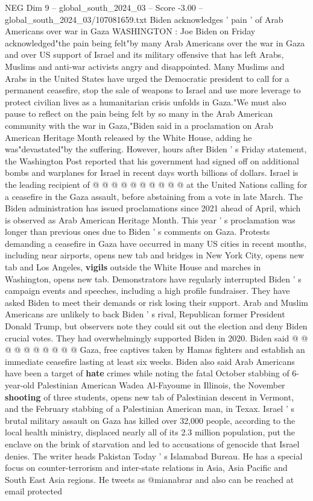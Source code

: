 \begin{textsample}{NEG Dim 9 – global\_south\_2024\_03 – Score -3.00 – global\_south\_2024\_03/107081659.txt}  \label{ex:f9_neg_380}
Biden acknowledges ' pain ' of Arab Americans over war in Gaza WASHINGTON : Joe Biden on Friday acknowledged"the pain being felt"by many Arab Americans over the war in Gaza and over US support of Israel and its military offensive that has left Arabs, Muslims and anti-war activists angry and disappointed.
Many Muslims and Arabs in the United States have urged the Democratic president to call for a permanent ceasefire, stop the sale of weapons to Israel and use more leverage to protect civilian lives as a humanitarian crisis unfolds in Gaza."We must also pause to reflect on the pain being felt by so many in the Arab American community with the war in Gaza,"Biden said in a proclamation on Arab American Heritage Month released by the White House, adding he was"devastated"by the suffering.
However, hours after Biden ' s Friday statement, the Washington Post reported that his government had signed off on additional bombs and warplanes for Israel in recent days worth billions of dollars.
Israel is the leading recipient of @ @ @ @ @ @ @ @ @ @ at the United Nations calling for a ceasefire in the Gaza assault, before abstaining from a vote in late March.
The Biden administration has issued proclamations since 2021 ahead of April, which is observed as Arab American Heritage Month.
This year ' s proclamation was longer than previous ones due to Biden ' s comments on Gaza.
Protests demanding a ceasefire in Gaza have occurred in many US cities in recent months, including near airports, opens new tab and bridges in New York City, opens new tab and Los Angeles, \textbf{vigils} outside the White House and marches in Washington, opens new tab.
Demonstrators have regularly interrupted Biden ' s campaign events and speeches, including a high profile fundraiser.
They have asked Biden to meet their demands or risk losing their support.
Arab and Muslim Americans are unlikely to back Biden ' s rival, Republican former President Donald Trump, but observers note they could sit out the election and deny Biden crucial votes.
They had overwhelmingly supported Biden in 2020.
Biden said @ @ @ @ @ @ @ @ @ @ Gaza, free captives taken by Hamas fighters and establish an immediate ceasefire lasting at least six weeks.
Biden also said Arab Americans have been a target of \textbf{hate} crimes while noting the fatal October stabbing of 6-year-old Palestinian American Wadea Al-Fayoume in Illinois, the November \textbf{shooting} of three students, opens new tab of Palestinian descent in Vermont, and the February stabbing of a Palestinian American man, in Texax.
Israel ' s brutal military assault on Gaza has killed over 32,000 people, according to the local health ministry, displaced nearly all of its 2.3 million population, put the enclave on the brink of starvation and led to accusations of genocide that Israel denies.
The writer heads Pakistan Today ' s Islamabad Bureau.
He has a special focus on counter-terrorism and inter-state relations in Asia, Asia Pacific and South East Asia regions.
He tweets as @mianabrar and also can be reached at email protected

\end{textsample}
